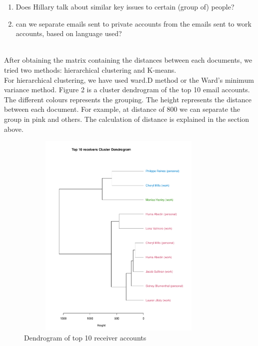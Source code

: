 \begin{enumerate}
  \item Does Hillary talk about similar key issues to certain (group of) people?
  \item can we separate emails sent to private accounts from the emails sent to work accounts, based on language used?
\end{enumerate}
\\
After obtaining the matrix containing the distances between each documents, we tried two methods: hierarchical clustering and K-means. 
\\
For hierarchical clustering, we have used ward.D method or the Ward's minimum variance method. Figure 2 is a cluster dendrogram of the top 10 email accounts. The different colours represents the grouping. The height represents the distance between each document. For example, at distance of 800 we can separate the group in pink and others. The calculation of distance is explained in the section above.
\begin{figure}[h!]
    \centering
    \includegraphics[width=10cm,height=10cm]
    {clusterp.pdf}
    \caption{Dendrogram of top 10 receiver accounts}
\end{figure}

